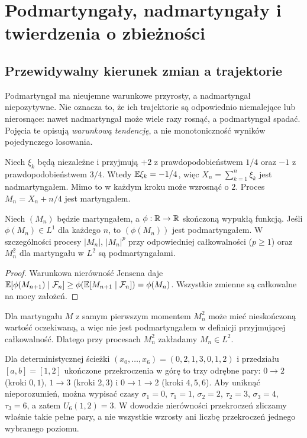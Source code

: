 \chapter{Podmartyngały, nadmartyngały i twierdzenia o zbieżności}
\label{ch:nadmartyngaly}

\section{Przewidywalny kierunek zmian a trajektorie}

Podmartyngał ma nieujemne warunkowe przyrosty,
a nadmartyngał niepozytywne. Nie oznacza to,
że ich trajektorie są odpowiednio niemalejące
lub nierosnące: nawet nadmartyngał może
wiele razy rosnąć, a podmartyngał spadać.
Pojęcia te opisują \emph{warunkową tendencję},
a nie monotoniczność wyników pojedynczego losowania.

\begin{przyklad}
Niech $\xi_k$ będą niezależne i przyjmują
$+2$ z prawdopodobieństwem $1/4$ oraz $-1$
z prawdopodobieństwem $3/4$. Wtedy
$\mathbb{E}\xi_k=-1/4$, więc
$X_n=\sum_{k=1}^n\xi_k$ jest nadmartyngałem.
Mimo to w każdym kroku może wzrosnąć o $2$.
Proces $M_n=X_n+n/4$ jest martyngałem.
\end{przyklad}

\begin{twierdzenie}
Niech $(M_n)$ będzie martyngałem,
a $\phi:\mathbb{R}\to\mathbb{R}$ skończoną wypukłą funkcją.
Jeśli $\phi(M_n)\in L^1$ dla każdego $n$,
to $(\phi(M_n))$ jest podmartyngałem.
W szczególności procesy $|M_n|$, $|M_n|^p$
przy odpowiedniej całkowalności ($p\geq1$)
oraz $M_n^2$ dla martyngału w $L^2$
są podmartyngałami.
\end{twierdzenie}
\begin{proof}
Warunkowa nierówność Jensena daje
$\mathbb{E}[\phi(M_{n+1})\mid\mathcal F_n]
\geq\phi(\mathbb{E}[M_{n+1}\mid\mathcal F_n])
=\phi(M_n)$. Wszystkie zmienne są całkowalne
na mocy założeń.
\end{proof}

\begin{przyklad}
Dla martyngału $M$ z samym pierwszym momentem
$M_n^2$ może mieć nieskończoną wartość oczekiwaną,
a więc nie jest podmartyngałem w definicji
przyjmującej całkowalność. Dlatego przy procesach
$M_n^2$ zakładamy $M_n\in L^2$.
\end{przyklad}

\begin{przyklad}
Dla deterministycznej ścieżki
$(x_0,\ldots,x_6)=(0,2,1,3,0,1,2)$
i przedziału $[a,b]=[1,2]$ ukończone przekroczenia w górę to trzy odrębne pary:
$0\to2$ (kroki $0,1$), $1\to3$ (kroki $2,3$)
i $0\to1\to2$ (kroki $4,5,6$).
Aby uniknąć nieporozumień, można wypisać czasy
$\sigma_1=0$, $\tau_1=1$,
$\sigma_2=2$, $\tau_2=3$,
$\sigma_3=4$, $\tau_3=6$,
a zatem $U_6(1,2)=3$. W dowodzie nierówności
przekroczeń zliczamy właśnie takie pełne pary,
a nie wszystkie wzrosty ani liczbę przekroczeń
jednego wybranego poziomu.
\end{przyklad}

